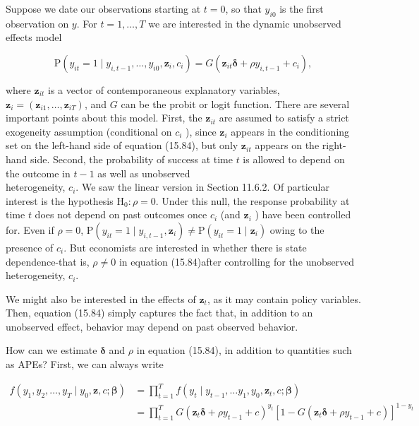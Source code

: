 \documentclass[10pt]{article}
\begin{document}
Suppose we date our observations starting at $t=0$, so that $y_{i 0}$ is the first observation on $y$. For $t=1, \ldots, T$ we are interested in the dynamic unobserved effects model


\begin{equation*}
\mathrm{P}\left(y_{i t}=1 \mid y_{i, t-1}, \ldots, y_{i 0}, \mathbf{z}_{i}, c_{i}\right)=G\left(\mathbf{z}_{i t} \boldsymbol{\delta}+\rho y_{i, t-1}+c_{i}\right), \tag{15.84}
\end{equation*}


where $\mathbf{z}_{i t}$ is a vector of contemporaneous explanatory variables, $\mathbf{z}_{i}=\left(\mathbf{z}_{i 1}, \ldots, \mathbf{z}_{i T}\right)$, and $G$ can be the probit or logit function. There are several important points about this model. First, the $\mathbf{z}_{i t}$ are assumed to satisfy a strict exogeneity assumption (conditional on $c_{i}$ ), since $\mathbf{z}_{i}$ appears in the conditioning set on the left-hand side of equation (15.84), but only $\mathbf{z}_{i t}$ appears on the right-hand side. Second, the probability of success at time $t$ is allowed to depend on the outcome in $t-1$ as well as unobserved\\
heterogeneity, $c_{i}$. We saw the linear version in Section 11.6.2. Of particular interest is the hypothesis $\mathrm{H}_{0}: \rho=0$. Under this null, the response probability at time $t$ does not depend on past outcomes once $c_{i}$ (and $\mathbf{z}_{i}$ ) have been controlled for. Even if $\rho=0$, $\mathrm{P}\left(y_{i t}=1 \mid y_{i, t-1}, \mathbf{z}_{i}\right) \neq \mathrm{P}\left(y_{i t}=1 \mid \mathbf{z}_{i}\right)$ owing to the presence of $c_{i}$. But economists are interested in whether there is state dependence-that is, $\rho \neq 0$ in equation (15.84)after controlling for the unobserved heterogeneity, $c_{i}$.

We might also be interested in the effects of $\mathbf{z}_{t}$, as it may contain policy variables. Then, equation (15.84) simply captures the fact that, in addition to an unobserved effect, behavior may depend on past observed behavior.

How can we estimate $\boldsymbol{\delta}$ and $\rho$ in equation (15.84), in addition to quantities such as APEs? First, we can always write


\begin{align*}
f\left(y_{1}, y_{2}, \ldots, y_{T} \mid y_{0}, \mathbf{z}, c ; \boldsymbol{\beta}\right) & =\prod_{t=1}^{T} f\left(y_{t} \mid y_{t-1}, \ldots y_{1}, y_{0}, \mathbf{z}_{t}, c ; \boldsymbol{\beta}\right) \\
& =\prod_{t=1}^{T} G\left(\mathbf{z}_{t} \boldsymbol{\delta}+\rho y_{t-1}+c\right)^{y_{t}}\left[1-G\left(\mathbf{z}_{t} \boldsymbol{\delta}+\rho y_{t-1}+c\right)\right]^{1-y_{t}} \tag{15.85}
\end{align*}
\end{document}
